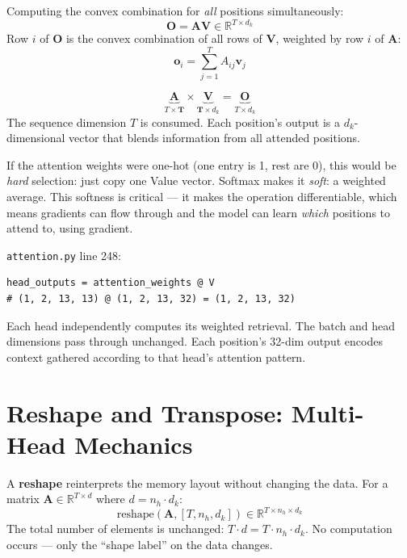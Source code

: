 \documentclass[11pt, a4paper]{article}
\newcommand{\R}{\mathbb{R}}
\newcommand{\vv}{\bm{v}}
\newcommand{\vo}{\bm{o}}
\newcommand{\mV}{\bm{V}}
\newcommand{\mA}{\bm{A}}
\newcommand{\mO}{\bm{O}}
\begin{document}
\begin{formaldef}
Computing the convex combination for \textit{all} positions simultaneously:
\[
\mO = \mA \mV \in \R^{T \times d_k}
\]
Row $i$ of $\mO$ is the convex combination of all rows of $\mV$, weighted by row $i$ of $\mA$:
\[
\vo_i = \sum_{j=1}^{T} A_{ij} \vv_j
\]
\end{formaldef}

\begin{dimcheck}
\[
\underbrace{\mA}_{T \times \mathbf{T}} \times \underbrace{\mV}_{\mathbf{T} \times d_k} = \underbrace{\mO}_{T \times d_k}
\]
The sequence dimension $T$ is consumed. Each position's output is a $d_k$-dimensional
vector that blends information from all attended positions.
\end{dimcheck}

\begin{intuition}
If the attention weights were one-hot (one entry is 1, rest are 0), this would be
\textit{hard} selection: just copy one Value vector. Softmax makes it \textit{soft}:
a weighted average. This softness is critical --- it makes the operation differentiable,
which means gradients can flow through and the model can learn \textit{which} positions
to attend to, using gradient.
\end{intuition}

\begin{transformer}
\texttt{attention.py} line 248:
\begin{verbatim}
head_outputs = attention_weights @ V
# (1, 2, 13, 13) @ (1, 2, 13, 32) = (1, 2, 13, 32)
\end{verbatim}
Each head independently computes its weighted retrieval. The batch and head
dimensions pass through unchanged. Each position's 32-dim output encodes
context gathered according to that head's attention pattern.
\end{transformer}

\section{Reshape and Transpose: Multi-Head Mechanics}

\begin{formaldef}
A \textbf{reshape} reinterprets the memory layout without changing the data.
For a matrix $\bm{A} \in \R^{T \times d}$ where $d = n_h \cdot d_k$:
\[
\text{reshape}(\bm{A}, [T, n_h, d_k]) \in \R^{T \times n_h \times d_k}
\]
The total number of elements is unchanged: $T \cdot d = T \cdot n_h \cdot d_k$.
No computation occurs --- only the ``shape label'' on the data changes.
\end{formaldef}
\end{document}
